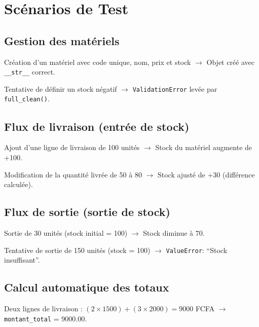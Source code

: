 \documentclass[12pt,a4paper]{report}
\begin{document}
\chapter{Scénarios de Test}

\section{Gestion des matériels}
\begin{tcolorbox}[title=Cas nominal]
Création d'un matériel avec code unique, nom, prix et stock $\rightarrow$ Objet créé avec \texttt{\_\_str\_\_} correct.
\end{tcolorbox}
\begin{tcolorbox}[title=Cas d'erreur]
Tentative de définir un stock négatif $\rightarrow$ \texttt{ValidationError} levée par \texttt{full\_clean()}.
\end{tcolorbox}

\section{Flux de livraison (entrée de stock)}
\begin{tcolorbox}[title=Cas nominal]
Ajout d'une ligne de livraison de 100 unités $\rightarrow$ Stock du matériel augmente de +100.
\end{tcolorbox}
\begin{tcolorbox}[title=Cas limite]
Modification de la quantité livrée de 50 à 80 $\rightarrow$ Stock ajusté de +30 (différence calculée).
\end{tcolorbox}

\section{Flux de sortie (sortie de stock)}
\begin{tcolorbox}[title=Cas nominal]
Sortie de 30 unités (stock initial = 100) $\rightarrow$ Stock diminue à 70.
\end{tcolorbox}
\begin{tcolorbox}[title=Cas d'erreur]
Tentative de sortie de 150 unités (stock = 100) $\rightarrow$ \texttt{ValueError}: ``Stock insuffisant''.
\end{tcolorbox}

\section{Calcul automatique des totaux}
\begin{tcolorbox}[title=Cas nominal]
Deux lignes de livraison : $(2 \times 1500) + (3 \times 2000) = 9000$ FCFA $\rightarrow$ \texttt{montant\_total} = 9000.00.
\end{tcolorbox}
\end{document}
